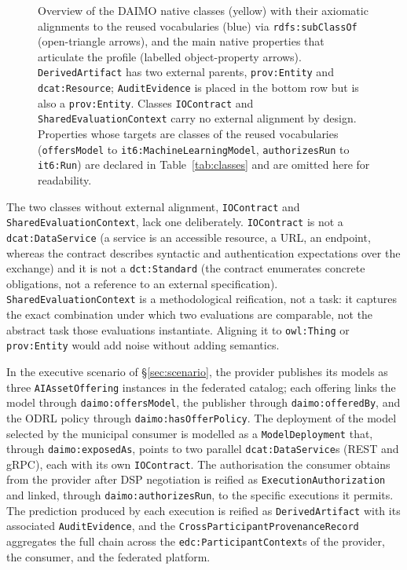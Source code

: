 \documentclass[Afour,sagev,times]{sagej}
\newcommand{\code}[1]{\texttt{#1}}
\begin{document}
\begin{figure}[t]
\caption{Overview of the DAIMO native classes (yellow) with their axiomatic alignments to the reused vocabularies (blue) via \code{rdfs:subClassOf} (open-triangle arrows), and the main native properties that articulate the profile (labelled object-property arrows). \code{DerivedArtifact} has two external parents, \code{prov:Entity} and \code{dcat:Resource}; \code{AuditEvidence} is placed in the bottom row but is also a \code{prov:Entity}. Classes \code{IOContract} and \code{SharedEvaluationContext} carry no external alignment by design. Properties whose targets are classes of the reused vocabularies (\code{offersModel} to \code{it6:MachineLearningModel}, \code{authorizesRun} to \code{it6:Run}) are declared in Table~\ref{tab:classes} and are omitted here for readability.}
\label{fig:classes}
\end{figure}

The two classes without external alignment, \code{IOContract} and \code{SharedEvaluationContext}, lack one deliberately. \code{IOContract} is not a \code{dcat:DataService} (a service is an accessible resource, a URL, an endpoint, whereas the contract describes syntactic and authentication expectations over the exchange) and it is not a \code{dct:Standard} (the contract enumerates concrete obligations, not a reference to an external specification). \code{SharedEvaluationContext} is a methodological reification, not a task: it captures the exact combination under which two evaluations are comparable, not the abstract task those evaluations instantiate. Aligning it to \code{owl:Thing} or \code{prov:Entity} would add noise without adding semantics.

In the executive scenario of §\ref{sec:scenario}, the provider publishes its models as three \code{AIAssetOffering} instances in the federated catalog; each offering links the model through \code{daimo:offersModel}, the publisher through \code{daimo:offeredBy}, and the ODRL policy through \code{daimo:hasOfferPolicy}. The deployment of the model selected by the municipal consumer is modelled as a \code{ModelDeployment} that, through \code{daimo:exposedAs}, points to two parallel \code{dcat:DataService}s (REST and gRPC), each with its own \code{IOContract}. The authorisation the consumer obtains from the provider after DSP negotiation is reified as \code{ExecutionAuthorization} and linked, through \code{daimo:authorizesRun}, to the specific executions it permits. The prediction produced by each execution is reified as \code{DerivedArtifact} with its associated \code{AuditEvidence}, and the \code{CrossParticipantProvenanceRecord} aggregates the full chain across the \code{edc:ParticipantContext}s of the provider, the consumer, and the federated platform.
\end{document}
